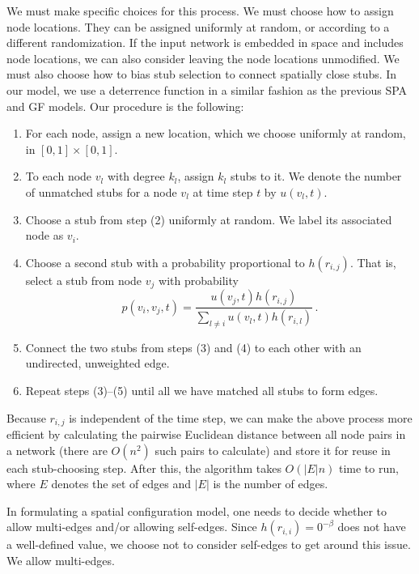 \documentclass[%
 reprint,
 amsmath,amssymb,
 aps,
]{revtex4-1}
\begin{document}
{\color{red}We must make specific choices for this process. We must choose how to assign node locations. They can be assigned uniformly at random, or according to a different randomization. If the input network is embedded in space and includes node locations, we can also consider leaving the node locations unmodified. We must also choose how to bias stub selection to connect spatially close stubs. In our model, we use a deterrence function in a similar fashion as the previous SPA and GF models. }Our procedure is the following:
\begin{enumerate}
    \item For each node, assign a new location, which we choose uniformly at random, in $[0, 1] \times [0, 1]$.
    \item To each node $v_l$ with degree $k_l$, assign $k_l$ stubs to it. We denote the number of unmatched stubs for a node $v_l$ at time step $t$ by $u(v_l, t)$.
    \item Choose a stub from step (2) uniformly at random. We label its associated node as $v_i$.
    \item Choose a second stub with a probability proportional to $h(r_{i,j})$. That is, select a stub from node $v_j$ with probability
   \begin{equation*}
    	p(v_i, v_j, t) = \frac{u(v_j, t)h(r_{i,j})}{\sum_{l \neq i} u(v_l, t)h(r_{i,l})} \,.
    \end{equation*}
    \item Connect the two stubs from steps (3) and (4) to each other with an undirected, unweighted edge. 
    \item Repeat steps (3)--(5) until all we have matched all stubs to form edges.
\end{enumerate}

Because $r_{i,j}$ is independent of the time step, we can make the above process more efficient by calculating the pairwise Euclidean distance between all node pairs in a network (there are $O(n^2)$ such pairs to calculate) and store it for reuse in each stub-choosing step. After this, the algorithm takes $O(|E| n)$ time to run, where $E$ denotes the set of edges and $|E|$ is the number of edges.

In formulating a spatial configuration model, one needs to decide whether to allow multi-edges and/or allowing self-edges. {\color{red}Since $h(r_{i,i}) = 0^{-\beta}$ does not have a well-defined value, we choose not to consider self-edges to get around this issue. We allow multi-edges.}
\end{document}
